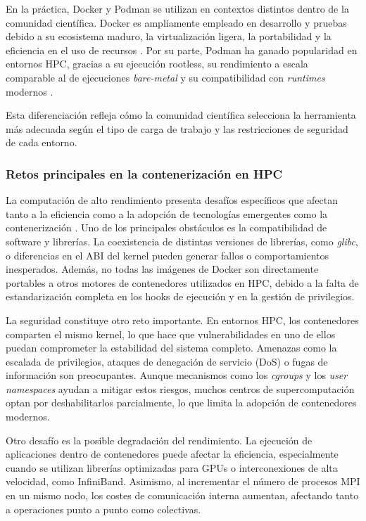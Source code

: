 En la práctica, Docker y Podman se utilizan en contextos distintos dentro de la comunidad científica. Docker es ampliamente empleado en desarrollo y pruebas debido a su ecosistema maduro, la virtualización ligera, la portabilidad y la eficiencia en el uso de recursos \cite{Bhatia2017THERT}. Por su parte, Podman ha ganado popularidad en entornos \acs{HPC}, gracias a su ejecución rootless, su rendimiento a escala comparable al de ejecuciones \textit{bare-metal} y su compatibilidad con \textit{runtimes} modernos \cite{gantikow2020rootless, stephey2022scaling}.

Esta diferenciación refleja cómo la comunidad científica selecciona la herramienta más adecuada según el tipo de carga de trabajo y las restricciones de seguridad de cada entorno.

\subsubsection{Retos principales en la contenerización en \acs{HPC}}

La computación de alto rendimiento presenta desafíos específicos que afectan tanto a la eficiencia como a la adopción de tecnologías emergentes como la contenerización \cite{zhou2022containerisation}. Uno de los principales obstáculos es la compatibilidad de software y librerías. La coexistencia de distintas versiones de librerías, como \textit{glibc}, o diferencias en el ABI del kernel pueden generar fallos o comportamientos inesperados. Además, no todas las imágenes de Docker son directamente portables a otros motores de contenedores utilizados en \acs{HPC}, debido a la falta de estandarización completa en los hooks de ejecución y en la gestión de privilegios.

La seguridad constituye otro reto importante. En entornos \acs{HPC}, los contenedores comparten el mismo kernel, lo que hace que vulnerabilidades en uno de ellos puedan comprometer la estabilidad del sistema completo. Amenazas como la escalada de privilegios, ataques de denegación de servicio (DoS) o fugas de información son preocupantes. Aunque mecanismos como los \textit{cgroups} y los \textit{user namespaces} ayudan a mitigar estos riesgos, muchos centros de supercomputación optan por deshabilitarlos parcialmente, lo que limita la adopción de contenedores modernos.

Otro desafío es la posible degradación del rendimiento. La ejecución de aplicaciones dentro de contenedores puede afectar la eficiencia, especialmente cuando se utilizan librerías optimizadas para GPUs o interconexiones de alta velocidad, como InfiniBand. Asimismo, al incrementar el número de procesos MPI en un mismo nodo, los costes de comunicación interna aumentan, afectando tanto a operaciones punto a punto como colectivas.

